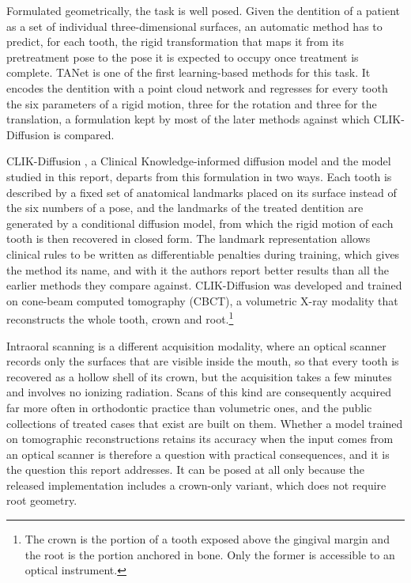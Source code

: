\documentclass[10pt,a4paper]{article}
\begin{document}
Formulated geometrically, the task is well posed. Given the dentition of a patient as a set of individual three-dimensional surfaces, an automatic method has to predict, for each tooth, the rigid transformation that maps it from its pretreatment pose to the pose it is expected to occupy once treatment is complete. TANet \citep{wei2020tanet} is one of the first learning-based methods for this task. It encodes the dentition with a point cloud network and regresses for every tooth the six parameters of a rigid motion, three for the rotation and three for the translation, a formulation kept by most of the later methods against which CLIK-Diffusion is compared.

CLIK-Diffusion \citep{DOU2025103746}, a Clinical Knowledge-informed diffusion model and the model studied in this report, departs from this formulation in two ways. Each tooth is described by a fixed set of anatomical landmarks placed on its surface instead of the six numbers of a pose, and the landmarks of the treated dentition are generated by a conditional diffusion model, from which the rigid motion of each tooth is then recovered in closed form. The landmark representation allows clinical rules to be written as differentiable penalties during training, which gives the method its name, and with it the authors report better results than all the earlier methods they compare against. CLIK-Diffusion was developed and trained on cone-beam computed tomography (CBCT), a volumetric X-ray modality that reconstructs the whole tooth, crown and root.\footnote{The crown is the portion of a tooth exposed above the gingival margin and the root is the portion anchored in bone. Only the former is accessible to an optical instrument.}

Intraoral scanning is a different acquisition modality, where an optical scanner records only the surfaces that are visible inside the mouth, so that every tooth is recovered as a hollow shell of its crown, but the acquisition takes a few minutes and involves no ionizing radiation. Scans of this kind are consequently acquired far more often in orthodontic practice than volumetric ones, and the public collections of treated cases that exist are built on them. Whether a model trained on tomographic reconstructions retains its accuracy when the input comes from an optical scanner is therefore a question with practical consequences, and it is the question this report addresses. It can be posed at all only because the released implementation includes a crown-only variant, which does not require root geometry.
\end{document}
